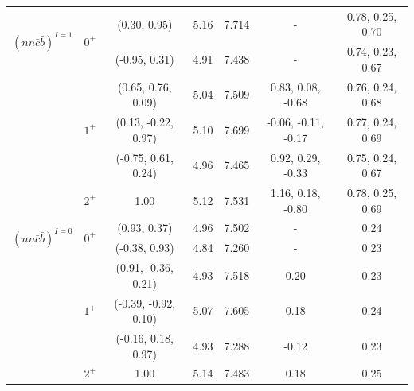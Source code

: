 \documentclass[prd,twocolumn,floatfix,nofootinbib]{revtex4}
\begin{document}
\begin{table}[!htbp]
\begin{tabular}{ccccccc}
        \multirow{2}{*}{${(nn\bar{c}\bar{b})}^{I=1}$}
                        &\multirow{2}{*}{$0^{+}$}
                                    &(0.30, 0.95)           &5.16	    &7.714	    &-                      &0.78, 0.25, 0.70 \\ 
                        &           &(-0.95, 0.31)          &4.91	    &7.438	    &-                      &0.74, 0.23, 0.67 \\ 
                        &\multirow{3}{*}{$1^{+}$}
                                    &(0.65, 0.76, 0.09)     &5.04	    &7.509	    &0.83, 0.08, -0.68      &0.76, 0.24, 0.68 \\ 
                        &           &(0.13, -0.22, 0.97)    &5.10	    &7.699	    &-0.06, -0.11, -0.17    &0.77, 0.24, 0.69 \\ 
                        &           &(-0.75, 0.61, 0.24)    &4.96	    &7.465	    &0.92, 0.29, -0.33      &0.75, 0.24, 0.67 \\ 
                        &$2^{+}$    &1.00                   &5.12	    &7.531	    &1.16, 0.18, -0.80      &0.78, 0.25, 0.69 \\ 
        \multirow{2}{*}{${(nn\bar{c}\bar{b})}^{I=0}$}
                        &\multirow{2}{*}{$0^{+}$}
                                    &(0.93, 0.37)           &4.96	    &7.502	    &-                      &0.24 \\ 
                        &           &(-0.38, 0.93)          &4.84	    &7.260	    &-                      &0.23 \\ 
                        &\multirow{3}{*}{$1^{+}$}
                                    &(0.91, -0.36, 0.21)    &4.93	    &7.518	    &0.20                   &0.23 \\ 
                        &           &(-0.39, -0.92, 0.10)   &5.07	    &7.605	    &0.18                   &0.24 \\ 
                        &           &(-0.16, 0.18, 0.97)    &4.93	    &7.288	    &-0.12                  &0.23 \\ 
                        &$2^{+}$    &1.00                   &5.14	    &7.483	    &0.18                   &0.25 \\ 
        \hline\hline
    \end{tabular}
\end{table}
\end{document}
